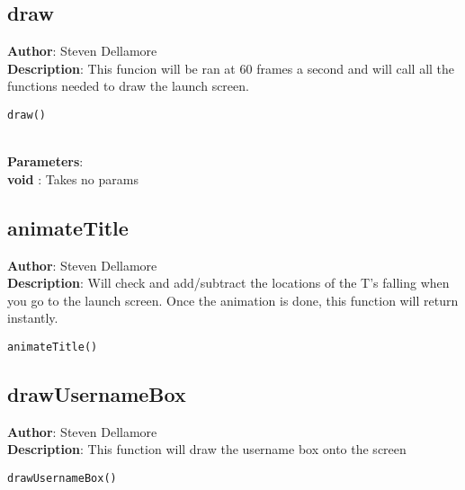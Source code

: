 \documentclass[12pt]{article}
\begin{document}
\subsection{draw}
\textbf{Author}: Steven Dellamore \\
\textbf{Description}: This funcion will be ran at 60 frames a second and will call all the functions needed to draw the launch screen. 

\begin{lstlisting}
draw()
\end{lstlisting}\textbf{\large{\\Parameters}}:\\
\textbf{void }: Takes no params\\

\subsection{animateTitle}
\textbf{Author}: Steven Dellamore \\
\textbf{Description}: Will check and add/subtract the locations of the T's falling when you go to the launch screen. Once the animation is done, this function will return instantly. 

\begin{lstlisting}
animateTitle()
\end{lstlisting}

\subsection{drawUsernameBox}
\textbf{Author}: Steven Dellamore \\
\textbf{Description}: This function will draw the username box onto the screen 

\begin{lstlisting}
drawUsernameBox()
\end{lstlisting}
\end{document}

